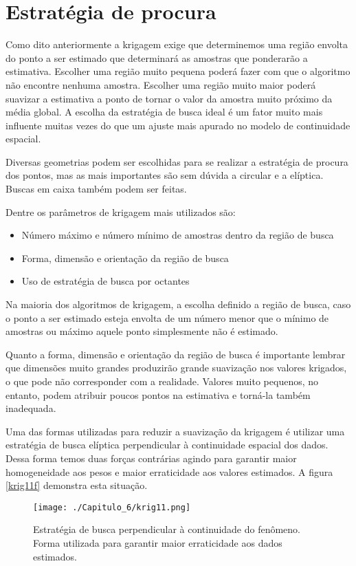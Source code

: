 \section{Estratégia de procura}

Como dito anteriormente a krigagem exige que determinemos uma região envolta do ponto a ser estimado que determinará as amostras que ponderarão a estimativa. Escolher uma região muito pequena poderá fazer com que o algoritmo não encontre nenhuma amostra. Escolher uma região muito maior poderá suavizar a estimativa a ponto de tornar o valor da amostra muito próximo da média global. A escolha da estratégia de busca ideal é um fator muito mais influente muitas vezes do que um ajuste mais apurado no modelo de continuidade espacial. 

Diversas geometrias podem ser escolhidas para se realizar a estratégia de procura dos pontos, mas as mais importantes são sem dúvida a circular e a elíptica. Buscas em caixa também podem ser feitas. 

Dentre os parâmetros de krigagem mais utilizados são: 

\begin{itemize}
  	\item Número máximo e número mínimo de amostras dentro da região de busca
  	\item Forma, dimensão e orientação da região de busca
  	\item Uso de estratégia de busca por octantes
\end{itemize} 

Na maioria dos algoritmos de krigagem, a escolha definido a região de busca, caso o ponto a ser estimado esteja envolta de um número menor que o mínimo de amostras ou máximo aquele ponto simplesmente não é estimado.

Quanto a forma, dimensão e orientação da região de busca é importante lembrar que dimensões muito grandes produzirão grande suavização nos valores krigados, o que pode não corresponder com a realidade. Valores muito pequenos, no entanto, podem atribuir poucos pontos na estimativa e torná-la também inadequada. 

Uma das formas utilizadas para reduzir a suavização da krigagem é utilizar uma estratégia de busca elíptica perpendicular à continuidade espacial dos dados. Dessa forma temos duas forças contrárias agindo para garantir maior homogeneidade aos pesos e maior erraticidade aos valores estimados. A figura \eqref{krig11f} demonstra esta situação.  

\begin{figure}[H]
	\centering
	\texttt{[image: ./Capitulo\_6/krig11.png]}
	\caption{Estratégia de busca perpendicular à continuidade do fenômeno. Forma utilizada para garantir maior erraticidade aos dados estimados.  }
	\label{krig11f}
\end{figure}

